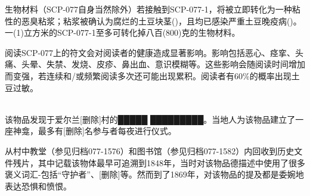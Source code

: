 生物材料（SCP-077自身当然除外）若接触到SCP-077-1，将被立即转化为一种粘性的恶臭粘浆；粘浆被确认为腐烂的土豆块茎()，且均已感染严重土豆晚疫病()。一(1)立方米的SCP-077-1至多可转化掉八百(800)克的生物材料。

阅读SCP-077上的符文会对阅读者的健康造成显著影响。影响包括恶心、痉挛、头痛、头晕、失禁、发烧、皮疹、鼻出血、意识模糊等。这些影响会随阅读时间增加而变强，若连续和\slash 或频繁阅读多次还可能出现累积。阅读者有60\%的概率出现土豆过敏。

\\
该物品发现于爱尔兰{[}删除]村的█████ █████████。当地人为该物品建立了一座神龛，最多有{[}删除]名参与者每夜进行仪式。

从村中教堂（参见归档077-1576）和图书馆（参见归档077-1582）内回收到历史文件残片，其中记载该物体最早可追溯到1848年，当时对该物品德描述中使用了很多褒义词汇-包括“守护者”、{[}删除]等。然而到了1869年，对该物品的提及都是委婉地表达恐惧和愤恨。
